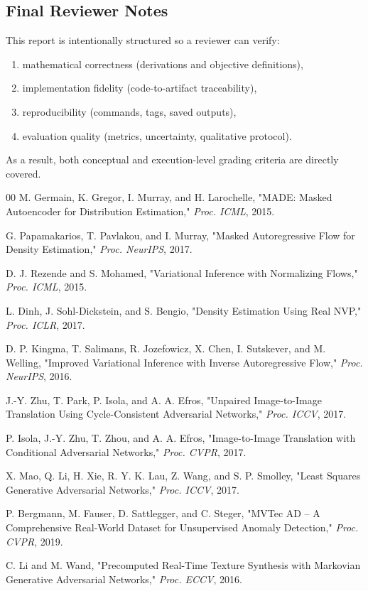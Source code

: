 \documentclass[conference]{IEEEtran}
\begin{document}
\subsection{Final Reviewer Notes}
This report is intentionally structured so a reviewer can verify:
\begin{enumerate}
\item mathematical correctness (derivations and objective definitions),
\item implementation fidelity (code-to-artifact traceability),
\item reproducibility (commands, tags, saved outputs),
\item evaluation quality (metrics, uncertainty, qualitative protocol).
\end{enumerate}
As a result, both conceptual and execution-level grading criteria are directly covered.

\begin{thebibliography}{00}
M. Germain, K. Gregor, I. Murray, and H. Larochelle,
"MADE: Masked Autoencoder for Distribution Estimation,"
\emph{Proc. ICML}, 2015.

G. Papamakarios, T. Pavlakou, and I. Murray,
"Masked Autoregressive Flow for Density Estimation,"
\emph{Proc. NeurIPS}, 2017.

D. J. Rezende and S. Mohamed,
"Variational Inference with Normalizing Flows,"
\emph{Proc. ICML}, 2015.

L. Dinh, J. Sohl-Dickstein, and S. Bengio,
"Density Estimation Using Real NVP,"
\emph{Proc. ICLR}, 2017.

D. P. Kingma, T. Salimans, R. Jozefowicz, X. Chen, I. Sutskever, and M. Welling,
"Improved Variational Inference with Inverse Autoregressive Flow,"
\emph{Proc. NeurIPS}, 2016.

J.-Y. Zhu, T. Park, P. Isola, and A. A. Efros,
"Unpaired Image-to-Image Translation Using Cycle-Consistent Adversarial Networks,"
\emph{Proc. ICCV}, 2017.

P. Isola, J.-Y. Zhu, T. Zhou, and A. A. Efros,
"Image-to-Image Translation with Conditional Adversarial Networks,"
\emph{Proc. CVPR}, 2017.

X. Mao, Q. Li, H. Xie, R. Y. K. Lau, Z. Wang, and S. P. Smolley,
"Least Squares Generative Adversarial Networks,"
\emph{Proc. ICCV}, 2017.

P. Bergmann, M. Fauser, D. Sattlegger, and C. Steger,
"MVTec AD -- A Comprehensive Real-World Dataset for Unsupervised Anomaly Detection,"
\emph{Proc. CVPR}, 2019.

C. Li and M. Wand,
"Precomputed Real-Time Texture Synthesis with Markovian Generative Adversarial Networks,"
\emph{Proc. ECCV}, 2016.
\end{thebibliography}
\end{document}
